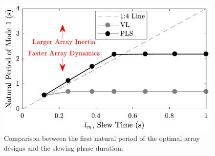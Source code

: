 \begin{figure}[t]
\centering
\includegraphics[width=0.6\columnwidth]{../ch7/figures/PeriodSlew}
\caption{Comparison between the first natural period of the optimal array designs and the slewing phase duration.}\label{fig:ch7:periods_pls}
\end{figure}